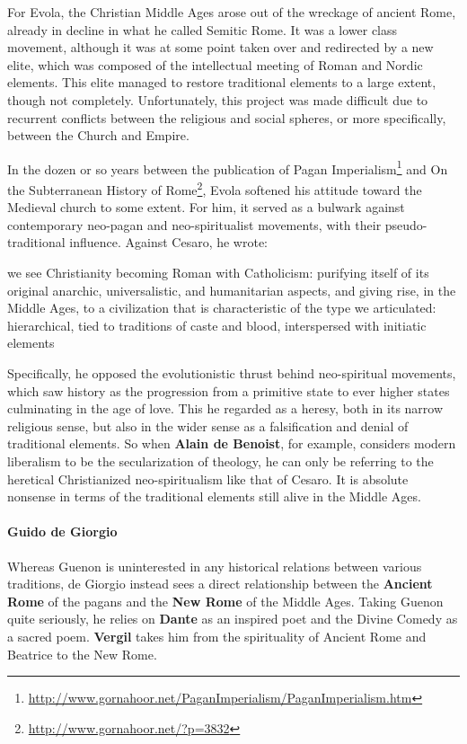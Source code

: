 For Evola, the Christian Middle Ages arose out of the wreckage of ancient Rome, already in decline in what he called Semitic Rome. It was a lower class movement, although it was at some point taken over and redirected by a new elite, which was composed of the intellectual meeting of Roman and Nordic elements. This elite managed to restore traditional elements to a large extent, though not completely. Unfortunately, this project was made difficult due to recurrent conflicts between the religious and social spheres, or more specifically, between the Church and Empire.

In the dozen or so years between the publication of Pagan Imperialism\footnote{\url{http://www.gornahoor.net/PaganImperialism/PaganImperialism.htm}} and On the Subterranean History of Rome\footnote{\url{http://www.gornahoor.net/?p=3832}}, Evola softened his attitude toward the Medieval church to some extent. For him, it served as a bulwark against contemporary neo-pagan and neo-spiritualist movements, with their pseudo-traditional influence. Against Cesaro, he wrote:

\begin{quotex}
we see Christianity becoming Roman with Catholicism: purifying itself of its original anarchic, universalistic, and humanitarian aspects, and giving rise, in the Middle Ages, to a civilization that is characteristic of the type we articulated: hierarchical, tied to traditions of caste and blood, interspersed with initiatic elements
\end{quotex}


Specifically, he opposed the evolutionistic thrust behind neo-spiritual movements, which saw history as the progression from a primitive state to ever higher states culminating in the age of love. This he regarded as a heresy, both in its narrow religious sense, but also in the wider sense as a falsification and denial of traditional elements. So when \textbf{Alain de Benoist}, for example, considers modern liberalism to be the secularization of theology, he can only be referring to the heretical Christianized neo-spiritualism like that of Cesaro. It is absolute nonsense in terms of the traditional elements still alive in the Middle Ages.

\paragraph{Guido de Giorgio}


Whereas Guenon is uninterested in any historical relations between various traditions, de Giorgio instead sees a direct relationship between the \textbf{Ancient Rome} of the pagans and the \textbf{New Rome} of the Middle Ages. Taking Guenon quite seriously, he relies on \textbf{Dante} as an inspired poet and the Divine Comedy as a sacred poem. \textbf{Vergil} takes him from the spirituality of Ancient Rome and Beatrice to the New Rome.

